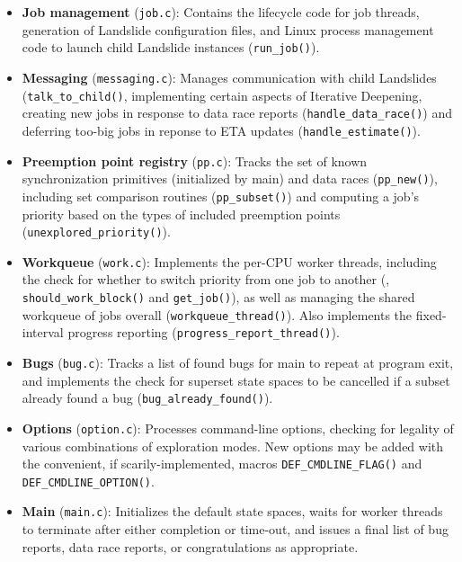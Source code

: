 \begin{itemize}
	\item {\bf Job management} ({\tt job.c}):
		Contains the lifecycle code for job threads,
		generation of Landslide configuration files,
		and Linux process management code to launch child Landslide instances ({\tt run\_job()}).
	\item {\bf Messaging} ({\tt messaging.c}):
		Manages communication with child Landslides ({\tt talk\_to\_child()},
		implementing certain aspects of Iterative Deepening,
		creating new jobs in response to data race reports ({\tt handle\_data\_race()})
		and deferring too-big jobs in reponse to ETA updates  ({\tt handle\_estimate()}).
	\item {\bf Preemption point registry} ({\tt pp.c}):
		Tracks the set of known synchronization primitives (initialized by main)
		and data races ({\tt pp\_new()}),
		including set comparison routines ({\tt pp\_subset()})
		and computing a job's priority based on the types of included preemption points ({\tt unexplored\_priority()}).
	\item {\bf Workqueue} ({\tt work.c}):
		Implements the per-CPU worker threads,
		including the check for whether to switch priority from one job to another
		(, {\tt should\_work\_block()} and {\tt get\_job()}),
		as well as managing the shared workqueue of jobs overall ({\tt workqueue\_thread()}).
		Also implements the fixed-interval progress reporting ({\tt progress\_report\_thread()}).
	\item {\bf Bugs} ({\tt bug.c}):
		Tracks a list of found bugs for main to repeat at program exit,
		and implements the check for superset state spaces to be cancelled if a subset already found a bug
		({\tt bug\_already\_found()}).
	\item {\bf Options} ({\tt option.c}):
		Processes command-line options,
		checking for legality of various combinations of exploration modes.
		New options may be added with the convenient, if scarily-implemented,
		macros {\tt DEF\_CMDLINE\_FLAG()} and {\tt DEF\_CMDLINE\_OPTION()}.
	\item {\bf Main} ({\tt main.c}):
		Initializes the default state spaces,
		waits for worker threads to terminate after either completion or time-out,
		and issues a final list of bug reports, data race reports, or congratulations as appropriate.
\end{itemize}

